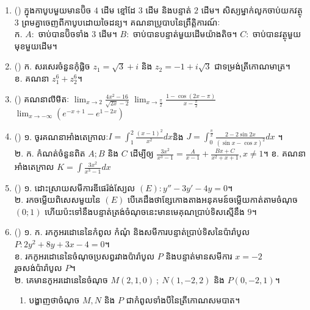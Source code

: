 \documentclass{officialexam}
\begin{document}
\begin{enumerate}[I]
	\item {\color{khtug}()} ក្នុងកាបូបមួយមានប៊ិច $4$ ដើម ខ្មៅដែ $3$ ដើម និងបន្ទាត់ $2$ ដើម។ សិស្យម្នាក់លូកចាប់យកវត្ថុ $3$ ព្រមគ្នាចេញពីកាបូបដោយចៃដន្យ។ គណនាប្រូបាបនៃព្រឹត្តិការណ៍ៈ\\
	{\color{khtug}ក.} $A:$ ចាប់បានប៊ិចទាំង $3$ ដើម។  $B:$ ចាប់បានបន្ទាត់មួយដើមយ៉ាងតិច។  $C:$ ចាប់បានវត្ថុមួយមុខមួយដើម។
	\item {\color{khtug}()} {\color{khtug}ក.} សរសេរចំនួនកុំផ្លិច $z_1=\sqrt{3}+i$ និង $z_2=-1+i\sqrt{3}$ ជាទម្រង់ត្រីកោណមាត្រ។\\
	{\color{khtug}ខ.} គណនា $z^{6}_1+z^{6}_2$។ 
	\item {\color{khtug}()} គណនាលីមីតៈ $\lim_{x\to2}\frac{4x^2-16}{\sqrt{2x}-2}$ $\lim_{x\to\frac{\pi}{2}}\frac{1-\cos\left(2x-\pi\right)}{x-\frac{\pi}{2}}$ $\lim_{x\to-\infty}\left(e^{-x+1}-e^{1-2x}\right)$ 
	\item {\color{khtug}()} {\color{khtug}១.} ចូរគណនាអាំងតេក្រាលៈ\quad $I=\int_{1}^{2}\frac{\left(x-1\right)^2}{x^2}dx$\quad និង $J=\int_{0}^{\frac{\pi}{2}}\frac{2-2\sin2x}{\left(\sin x-\cos x\right)^2}dx$ ។\\
	{\color{khtug}២.} {\color{khtug}ក.} កំណត់ចំនួនពិត $A;B$ និង $C$ ដើម្បីឲ្យ $\frac{3x^2}{x^3-1}=\frac{A}{x-1}+\frac{Bx+C}{x^2+x+1}, x\ne1$។ {\color{khtug}ខ.} គណនាអាំងតេក្រាល $K=\int\frac{3x^2}{x^3-1}dx$
	\item {\color{khtug}()} {\color{khtug}១.} ដោះស្រាយសមីការឌីផេរ៉ង់ស្យែល $(E): y''-3y'-4y=0$។\\
	{\color{khtug}២.} រកចម្លើយពិសេសមួយនៃ $(E)$ បើគេដឹងថាខ្សែកោងតាងអនុគមន៍ចម្លើយកាត់តាមចំណុច $\left(0;1\right)$ ហើយប៉ះទៅនឹងបន្ទាត់ត្រង់ចំណុចនេះមានមេគុណប្រាប់ទិសស្មើនឹង $9$។
	\item {\color{khtug}()} {\color{khtug}១.} {\color{khtug}ក.} រកកូអរដោនេនៃកំពូល កំណុំ និងសមីការបន្ទាត់ប្រាប់ទិសនៃប៉ារ៉ាបូល $P: 2y^2+8y+3x-4=0$។\\
	{\color{khtug}ខ.} រកកូអរដោនេនៃចំណុចប្រសព្វរវាងប៉ារ៉ាបូល $P$ និងបន្ទាត់មានសមីការ $x=-2$ រួចសង់ប៉ារ៉ាបូល $P$។\\
	{\color{khtug}២.} គេមានកូអរដោនេនៃចំណុច $M\left(2,1,0\right)~;~N\left(1,-2,2\right)$ និង $P\left(0,-2,1\right)$។
	\begin{enumerate}[k]
		\item បង្ហាញថាចំណុច $M,N$ និង $P$ ជាកំពូលទាំងបីនៃត្រីកោណសមបាត។

\end{enumerate}
\end{enumerate}
\end{document}
